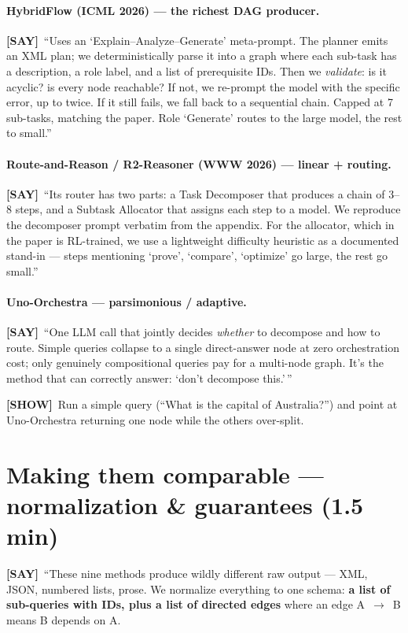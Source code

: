 \documentclass[11pt]{article}
\newcommand{\say}{\textcolor{sayc}{\textbf{[SAY]}}\ }
\newcommand{\showcue}{\textcolor{showc}{\textbf{[SHOW]}}\ }
\begin{document}
\paragraph{HybridFlow (ICML 2026) --- the richest DAG producer.}
\say ``Uses an `Explain--Analyze--Generate' meta-prompt. The planner emits an XML
plan; we deterministically parse it into a graph where each sub-task has a
description, a role label, and a list of prerequisite IDs. Then we \emph{validate}:
is it acyclic? is every node reachable? If not, we re-prompt the model with the
specific error, up to twice. If it still fails, we fall back to a sequential
chain. Capped at 7 sub-tasks, matching the paper. Role `Generate' routes to the
large model, the rest to small.''

\paragraph{Route-and-Reason / R2-Reasoner (WWW 2026) --- linear + routing.}
\say ``Its router has two parts: a Task Decomposer that produces a chain of 3--8
steps, and a Subtask Allocator that assigns each step to a model. We reproduce the
decomposer prompt verbatim from the appendix. For the allocator, which in the
paper is RL-trained, we use a lightweight difficulty heuristic as a documented
stand-in --- steps mentioning `prove', `compare', `optimize' go large, the rest
go small.''

\paragraph{Uno-Orchestra --- parsimonious / adaptive.}
\say ``One LLM call that jointly decides \emph{whether} to decompose and how to
route. Simple queries collapse to a single direct-answer node at zero
orchestration cost; only genuinely compositional queries pay for a multi-node
graph. It's the method that can correctly answer: `don't decompose this.'\,''

\showcue Run a simple query (``What is the capital of Australia?'') and point at
Uno-Orchestra returning one node while the others over-split.

\section{Making them comparable --- normalization \& guarantees (1.5 min)}

\say ``These nine methods produce wildly different raw output --- XML, JSON,
numbered lists, prose. We normalize everything to one schema: \textbf{a list of
sub-queries with IDs, plus a list of directed edges} where an edge
A~$\rightarrow$~B means B depends on A.
\end{document}
